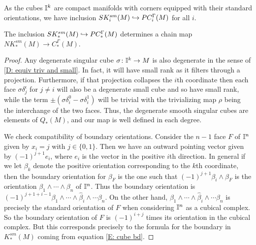 As the cubes $\mathbb{I}^k$ are compact manifolds with corners equipped with their standard orientations,
we have inclusion $SK^{sm}_i(M) \hookrightarrow PC_i^\Gamma(M)$ for all $i$.

\begin{lemma}
	The inclusion $SK^{sm}_*(M) \hookrightarrow PC_*^\Gamma(M)$ determines a chain map $NK^{sm}_*(M) \to C_*^\Gamma(M)$.
\end{lemma}

\begin{proof}
	Any degenerate singular cube $\sigma \colon \mathbb{I}^k \to M$ is also degenerate in the sense of \cref{D: equiv triv and small}.
	In fact, it will have small rank as it filters through a projection.
	Furthermore, if that projection collapses the $i$th coordinate then each face $\sigma \delta_j^\epsilon$ for $j\neq i$ will also be a degenerate small cube and so have small rank, while the term $\pm (\sigma \delta_i^0-\sigma \delta_i^1)$ will be trivial with the trivializing map $\rho$ being the interchange of the two faces.
	Thus, the degenerate smooth singular cubes are elements of $Q_*(M)$, and our map is well defined in each degree.

	We check compatibility of boundary orientations.
	Consider the $n-1$ face $F$ of $\mathbb{I}^n$ given by $x_i = j$ with $j\in\{0,1\}$.
	Then we have an outward pointing vector given by $(-1)^{j+1}e_i$, where $e_i$ is the vector in the positive $i$th direction.
	In general if we let $\beta_k$ denote the positive orientation corresponding to the $k$th coordinate, then the boundary orientation for $\beta_F$ is the one such that
	$(-1)^{j+1}\beta_i \wedge \beta_F$ is the orientation $\beta_1 \wedge\cdots\wedge \beta_n$ of $\mathbb{I}^n$.
	Thus the boundary orientation is $(-1)^{j+1+i-1}\beta_1 \wedge \cdots \wedge \hat{\beta}_i \wedge \cdots\beta_n$.
	On the other hand, $\beta_1 \wedge \cdots \wedge \hat{\beta}_i \wedge \cdots\beta_n$ is precisely the standard orientation of $F$ when considering $\mathbb{I}^n$ as a cubical complex.
	So the boundary orientation of $F$ is $(-1)^{i+j}$ times its orientation in the cubical complex.
	But this corresponds precisely to the formula for the boundary in $K^{sm}_*(M)$ coming from equation \eqref{E: cube bd}.
\end{proof}

